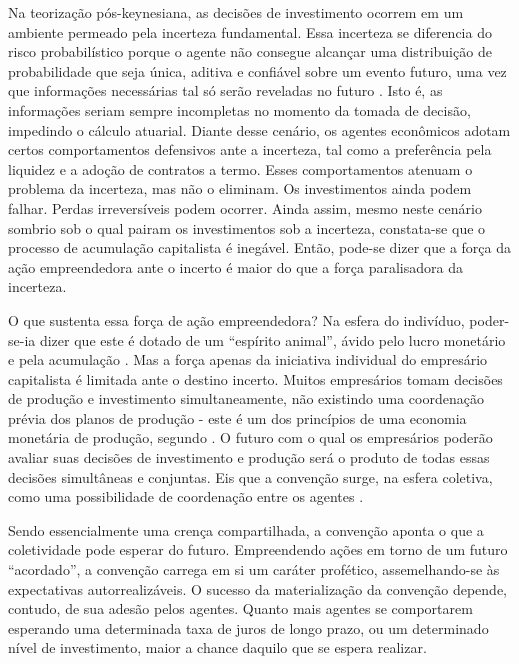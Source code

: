 Na teorização pós-keynesiana, as decisões de investimento ocorrem em um ambiente permeado pela incerteza fundamental. Essa incerteza se diferencia do risco probabilístico porque o agente não consegue alcançar uma distribuição de probabilidade que seja única, aditiva e confiável sobre um evento futuro, uma vez que informações necessárias tal só serão reveladas no futuro \parencite{dequech_uncertainty_2011}. Isto é, as informações seriam sempre incompletas no momento da tomada de decisão, impedindo o cálculo atuarial. Diante desse cenário, os agentes econômicos adotam certos comportamentos defensivos ante a incerteza, tal como a preferência pela liquidez e a adoção de contratos a termo. Esses comportamentos atenuam o problema da incerteza, mas não o eliminam. Os investimentos ainda podem falhar. Perdas irreversíveis podem ocorrer. Ainda assim, mesmo neste cenário sombrio sob o qual pairam os investimentos sob a incerteza, constata-se que o processo de acumulação capitalista é inegável. Então, pode-se dizer que a força da ação empreendedora ante o incerto é maior do que a força paralisadora da incerteza. 

O que sustenta essa força de ação empreendedora? Na esfera do indivíduo, poder-se-ia dizer que este é dotado de um \enquote{espírito animal}, ávido pelo lucro monetário e pela acumulação \parencite{abramo_cidade_2007}. Mas a força apenas da iniciativa individual do empresário capitalista é limitada ante o destino incerto. Muitos empresários tomam decisões de produção e investimento simultaneamente, não existindo uma coordenação prévia dos planos de produção - este é um dos princípios de uma economia monetária de produção, segundo \textcite{carvalho_keynes_2020}. O futuro com o qual os empresários poderão avaliar suas decisões de investimento e produção será o produto de todas essas decisões simultâneas e conjuntas. Eis que a convenção surge, na esfera coletiva, como uma possibilidade de coordenação entre os agentes \parencite{abramo_cidade_2007, carvalho_expectativas_2014}. 

Sendo essencialmente uma crença compartilhada, a convenção aponta o que a coletividade pode esperar do futuro. Empreendendo ações em torno de um futuro \enquote{acordado}, a convenção carrega em si um caráter profético, assemelhando-se às expectativas autorrealizáveis. O sucesso da materialização da convenção depende, contudo, de sua adesão pelos agentes. Quanto mais agentes se comportarem esperando uma determinada taxa de juros de longo prazo, ou um determinado nível de investimento, maior a chance daquilo que se espera realizar. 

